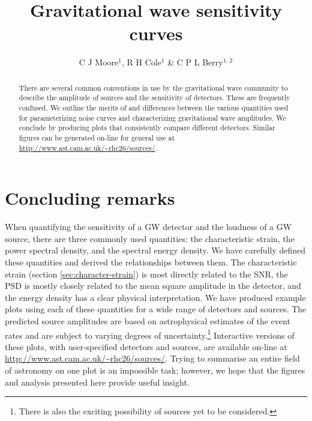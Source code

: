 \documentclass[fleqn,12pt]{iopart}
\begin{document}
\title{Gravitational wave sensitivity curves}
\author{C J Moore$^1$, R H Cole$^1$ \& C P L Berry$^{1,\,2}$}
\address{$^1$ Institute of Astronomy, Madingley Road, Cambridge, CB3 0HA, United Kingdom}
\address{$^2$ School of Physics and Astronomy, University of Birmingham, Edgbaston, Birmingham B15 2TT, United Kingdom}

\begin{abstract}
There are several common conventions in use by the gravitational wave community to describe the amplitude of sources and the sensitivity of detectors. These are frequently confused. We outline the merits of and differences between the various quantities used for parameterizing noise curves and characterizing gravitational wave amplitudes. We conclude by producing plots that consistently compare different detectors. Similar figures can be generated on-line for general use at \url{http://www.ast.cam.ac.uk/~rhc26/sources/}.
\end{abstract}







\section{Concluding remarks}\label{sec:discussion}

When quantifying the sensitivity of a GW detector and the loudness of a GW source, there are three commonly used quantities: the characteristic strain, the power spectral density, and the spectral energy density. We have carefully defined these quantities and derived the relationships between them. The characteristic strain (section \ref{sec:character-strain}) is most directly related to the SNR, the PSD is mostly closely related to the mean square amplitude in the detector, and the energy density has a clear physical interpretation. We have produced example plots using each of these quantities for a wide range of detectors and sources. The predicted source amplitudes are based on astrophysical estimates of the event rates and are subject to varying degrees of uncertainty.\footnote{There is also the exciting possibility of sources yet to be considered.} Interactive versions of these plots, with user-specified detectors and sources, are available on-line at \url{http://www.ast.cam.ac.uk/~rhc26/sources/}. Trying to summarise an entire field of astronomy on one plot is an impossible task; however, we hope that the figures and analysis presented here provide useful insight.



\clearpage



\end{document}
